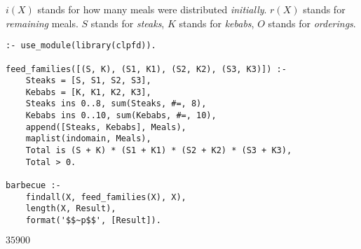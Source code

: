 \documentclass[11pt]{article}
\begin{document}
\(i(X)\) stands for how many meals were distributed \emph{initially}.  \(r(X)\)
stands for \emph{remaining} meals.  \(S\) stands for \emph{steaks}, \(K\) stands for
\emph{kebabs}, \(O\) stands for \emph{orderings}.

\lstset{language=prolog,label= ,caption= ,captionpos=b,numbers=none}
\begin{lstlisting}
:- use_module(library(clpfd)).

feed_families([(S, K), (S1, K1), (S2, K2), (S3, K3)]) :-
    Steaks = [S, S1, S2, S3],
    Kebabs = [K, K1, K2, K3],
    Steaks ins 0..8, sum(Steaks, #=, 8),
    Kebabs ins 0..10, sum(Kebabs, #=, 10),
    append([Steaks, Kebabs], Meals),
    maplist(indomain, Meals),
    Total is (S + K) * (S1 + K1) * (S2 + K2) * (S3 + K3),
    Total > 0.

barbecue :-
    findall(X, feed_families(X), X),
    length(X, Result),
    format('$$~p$$', [Result]).
\end{lstlisting}

\(35900\)
\end{document}
